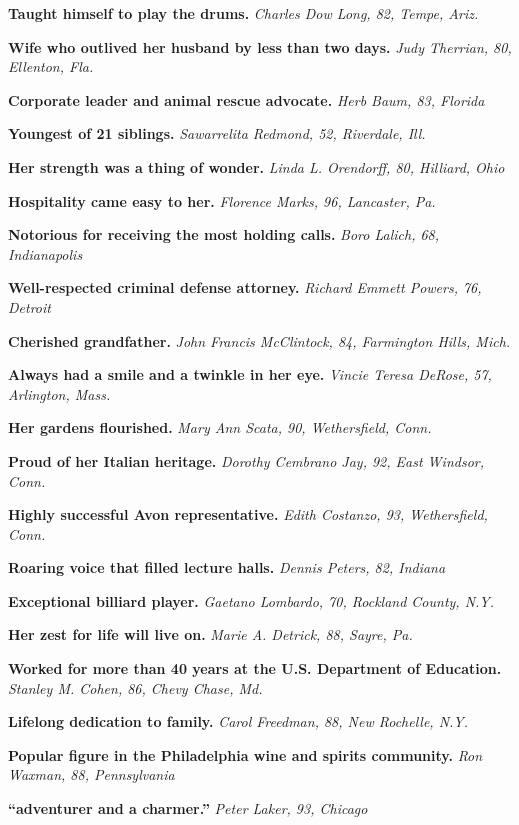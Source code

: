 \textbf{Taught himself to play the drums.} \emph{Charles Dow Long, 82,
Tempe, Ariz.}

\textbf{Wife who outlived her husband by less than two days.} \emph{Judy
Therrian, 80, Ellenton, Fla.}

\textbf{Corporate leader and animal rescue advocate.} \emph{Herb Baum,
83, Florida}

\textbf{Youngest of 21 siblings.} \emph{Sawarrelita Redmond, 52,
Riverdale, Ill.}

\textbf{Her strength was a thing of wonder.} \emph{Linda L. Orendorff,
80, Hilliard, Ohio}

\textbf{Hospitality came easy to her.} \emph{Florence Marks, 96,
Lancaster, Pa.}

\textbf{Notorious for receiving the most holding calls.} \emph{Boro
Lalich, 68, Indianapolis}

\textbf{Well-respected criminal defense attorney.} \emph{Richard Emmett
Powers, 76, Detroit}

\textbf{Cherished grandfather.} \emph{John Francis McClintock, 84,
Farmington Hills, Mich.}

\textbf{Always had a smile and a twinkle in her eye.} \emph{Vincie
Teresa DeRose, 57, Arlington, Mass.}

\textbf{Her gardens flourished.} \emph{Mary Ann Scata, 90, Wethersfield,
Conn.}

\textbf{Proud of her Italian heritage.} \emph{Dorothy Cembrano Jay, 92,
East Windsor, Conn.}

\textbf{Highly successful Avon representative.} \emph{Edith Costanzo,
93, Wethersfield, Conn.}

\textbf{Roaring voice that filled lecture halls.} \emph{Dennis Peters,
82, Indiana}

\textbf{Exceptional billiard player.} \emph{Gaetano Lombardo, 70,
Rockland County, N.Y.}

\textbf{Her zest for life will live on.} \emph{Marie A. Detrick, 88,
Sayre, Pa.}

\textbf{Worked for more than 40 years at the U.S. Department of
Education.} \emph{Stanley M. Cohen, 86, Chevy Chase, Md.}

\textbf{Lifelong dedication to family.} \emph{Carol Freedman, 88, New
Rochelle, N.Y.}

\textbf{Popular figure in the Philadelphia wine and spirits community.}
\emph{Ron Waxman, 88, Pennsylvania}

\textbf{``adventurer and a charmer.''} \emph{Peter Laker, 93, Chicago}

